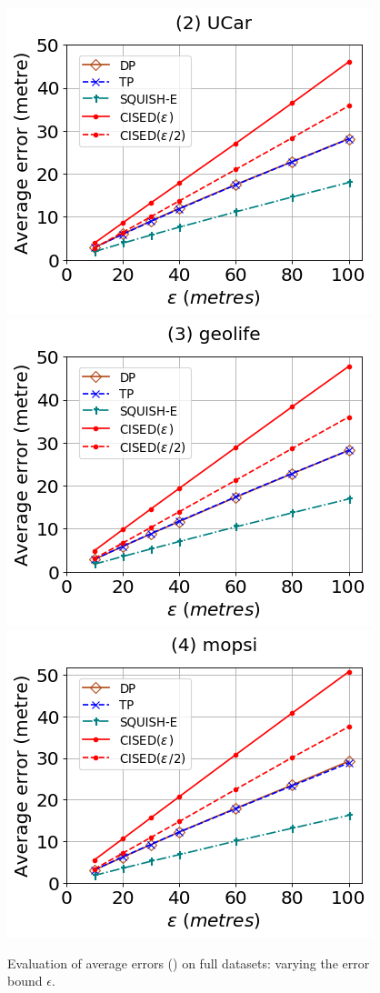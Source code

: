 \begin{figure}[tb!]
	\centering
	\includegraphics[scale=0.320]{Figures/Exp-SED-error-epsilon-service.png}	\hspace{3ex}
	\includegraphics[scale=0.320]{Figures/Exp-SED-error-epsilon-geolife.png}	\hspace{3ex}
	\includegraphics[scale=0.320]{Figures/Exp-SED-error-epsilon-mopsi.png}		
	\vspace{-2ex}
	\caption{\small Evaluation of average errors (\sed) on full datasets: varying the error bound $\epsilon$.}
	\label{fig:ae-sed-epsilon}
	\vspace{-2ex}
\end{figure}

